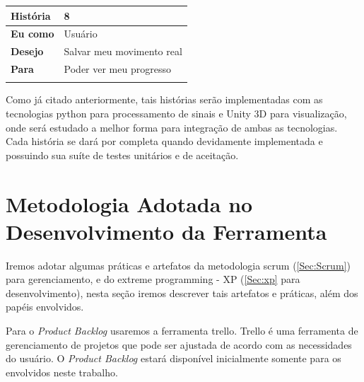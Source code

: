 \begin{table}[]
\begin{tabular}{|l|l|}
\textbf{História} & 8                                                        \\ \hline
\textbf{Eu como}  & Usuário                                                  \\ \hline
\textbf{Desejo}   & Salvar meu movimento real                                \\ \hline
\textbf{Para}     & Poder ver meu progresso                                  \\ \hline
\multicolumn{2}{|l|}{}                                                       \\ \hline
\end{tabular}
\end{table}



  Como já citado anteriormente, tais histórias serão implementadas com as tecnologias
python para processamento de sinais e Unity 3D para visualização, onde será 
estudado a melhor forma para integração de ambas as tecnologias. Cada história
se dará por completa quando devidamente implementada e possuindo sua suíte de testes
unitários e de aceitação.

\section{Metodologia Adotada no Desenvolvimento da Ferramenta}

  Iremos adotar algumas práticas e artefatos da  metodologia 
scrum (\ref{Sec:Scrum}) para gerenciamento, e do extreme programming - XP (\ref{Sec:xp}
para desenvolvimento), nesta seção iremos descrever tais artefatos e práticas, 
além dos papéis envolvidos.

  Para o \textit{Product Backlog}  usaremos a ferramenta trello. Trello é uma ferramenta
de gerenciamento de projetos que pode ser ajustada de acordo com as necessidades
do usuário. O \textit{Product Backlog} estará disponível inicialmente somente para
os envolvidos neste trabalho.

